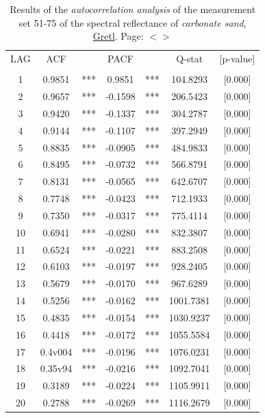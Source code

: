 \documentclass[11pt]{article}
\begin{document}
\begin{appendices}
\begin{table}[H]\footnotesize
	\caption{Results of the \textit{autocorrelation analysis} of the measurement set 51-75 of the spectral reflectance of \textit{carbonate sand}, \href{http://gretl.sourceforge.net/}{Gretl}. Page: $<$\pageref{page-41}$>$}
	\begin{center}
	\begin{tabular}{|c c c c c c c||}
		\hline\hline
		LAG & ACF & & PACF & & Q-stat & [p-value] \\ \\ \hline\hline
		1  & 0.9851 & ***  & 0.9851& ***   & 104.8293 & [0.000]\\ \hline
		    2  & 0.9657  &***  &-0.1598  &   ***  &  206.5423  &[0.000]\\ \hline
		    3  & 0.9420  &***  &-0.1337  &  ***   &  304.2787  &[0.000]\\ \hline
		    4  & 0.9144  &***  &-0.1107  &  ***   &  397.2949  &[0.000]\\ \hline
		    5  & 0.8835  &***  &-0.0905  &  ***   &  484.9833  &[0.000]\\ \hline
		    6  & 0.8495 & ***  &-0.0732  &  ***   &  566.8791  &[0.000]\\ \hline
		    7  & 0.8131 & ***  &-0.0565  &  ***   &  642.6707  &[0.000]\\ \hline
		    8  & 0.7748 & ***  &-0.0423  &  ***   &  712.1933  &[0.000]\\ \hline
		    9  & 0.7350 & ***  &-0.0317  &  ***   &  775.4114  &[0.000]\\ \hline
		   10 &  0.6941&  *** & -0.0280 &  ***   &   832.3807 & [0.000]\\ \hline
		   11 &  0.6524 & *** & -0.0221 &  ***   &   883.2508 & [0.000]\\ \hline
		   12 &  0.6103 & *** & -0.0197 &  ***   &   928.2405 & [0.000]\\ \hline
		   13 &  0.5679 & *** & -0.0170 &  ***   &   967.6289 & [0.000]\\ \hline
		   14 &  0.5256 & *** & -0.0162 &  ***   &  1001.7381&  [0.000]\\ \hline
		   15 &  0.4835 & *** & -0.0154 &  ***   &  1030.9237 & [0.000]\\ \hline
		   16 & 0.4418 & *** & -0.0172  &  ***  &  1055.5584 & [0.000]\\ \hline
		   17  & 0.4v004 & *** & -0.0196 &***     &  1076.0231 & [0.000]\\ \hline
		   18 & 0.35v94 & *** & -0.0216  & ***   &  1092.7041 & [0.000]\\ \hline
		   19 &  0.3189 & *** & -0.0224   & ***  &  1105.9911 & [0.000]\\ \hline
		   20 &  0.2788 & *** & -0.0269   & ***  &  1116.2679 & [0.000]\\ \hline
	\end{tabular}
	\end{center}
	\label{tab:28}
\end{table}


\end{appendices}
\end{document}
